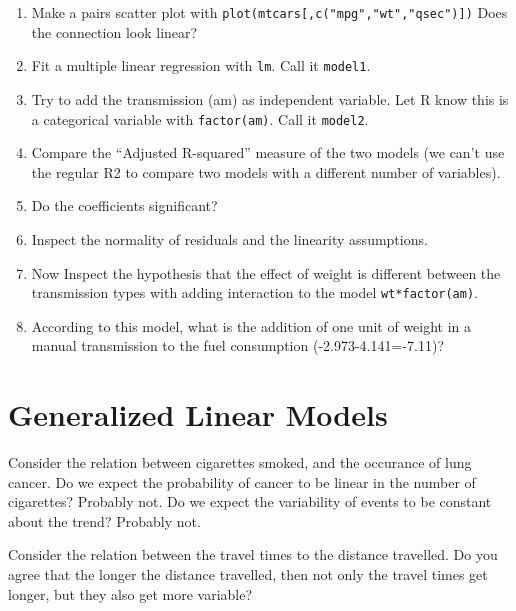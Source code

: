 \documentclass[]{book}
\providecommand{\tightlist}{%
  \setlength{\itemsep}{0pt}\setlength{\parskip}{0pt}}
\theoremstyle{definition}
\theoremstyle{definition}
\theoremstyle{definition}
\theoremstyle{remark}
\let\BeginKnitrBlock\begin \let\EndKnitrBlock\end
\begin{document}
\begin{enumerate}
  \begin{enumerate}
  \def\labelenumii{\arabic{enumii}.}
  \tightlist
  \item
    Make a pairs scatter plot with
    \texttt{plot(mtcars{[},c("mpg","wt","qsec"){]})} Does the connection
    look linear?
  \item
    Fit a multiple linear regression with \texttt{lm}. Call it
    \texttt{model1}.
  \item
    Try to add the transmission (am) as independent variable. Let R know
    this is a categorical variable with \texttt{factor(am)}. Call it
    \texttt{model2}.
  \item
    Compare the ``Adjusted R-squared'' measure of the two models (we
    can't use the regular R2 to compare two models with a different
    number of variables).
  \item
    Do the coefficients significant?
  \item
    Inspect the normality of residuals and the linearity assumptions.
  \item
    Now Inspect the hypothesis that the effect of weight is different
    between the transmission types with adding interaction to the model
    \texttt{wt*factor(am)}.
  \item
    According to this model, what is the addition of one unit of weight
    in a manual transmission to the fuel consumption
    (-2.973-4.141=-7.11)?
  \end{enumerate}
\end{enumerate}

\chapter{Generalized Linear Models}\label{glm}

\BeginKnitrBlock{example}
\protect\hypertarget{exm:cigarettes}{}{\label{exm:cigarettes} }Consider the
relation between cigarettes smoked, and the occurance of lung cancer. Do
we expect the probability of cancer to be linear in the number of
cigarettes? Probably not. Do we expect the variability of events to be
constant about the trend? Probably not.
\EndKnitrBlock{example}

\BeginKnitrBlock{example}
\protect\hypertarget{exm:cars}{}{\label{exm:cars} }Consider the relation
between the travel times to the distance travelled. Do you agree that
the longer the distance travelled, then not only the travel times get
longer, but they also get more variable?
\EndKnitrBlock{example}
\end{document}

